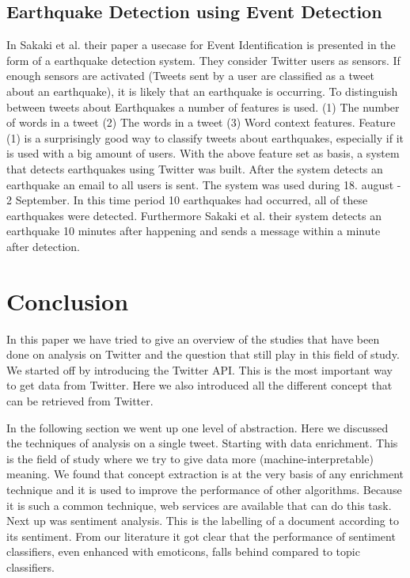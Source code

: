 \documentclass{article}
\begin{document}
\subsection*{Earthquake Detection using Event Detection}

In Sakaki et al. their paper a usecase for Event Identification is presented in the form of a earthquake detection system. \cite{earthq} They consider 
Twitter users as sensors. If enough sensors are activated (Tweets sent by a user are classified as a tweet about an earthquake), it is likely that an 
earthquake is occurring. 
To distinguish between tweets about Earthquakes a number of features is used. (1) The number of words in a tweet (2) The words in a tweet (3) Word context 
features. Feature (1) is a surprisingly good way to classify tweets about earthquakes, especially if it is used with a big amount of users. With the above 
feature set as basis, a system that detects earthquakes using Twitter was built. After the system detects an earthquake an email to all users is sent. 
The system was used during 18. august - 2 September. In this time period 10 earthquakes had occurred, all of these earthquakes were detected. Furthermore 
Sakaki et al. their system detects an earthquake 10 minutes after happening and sends a message within a minute after detection. 
\cite{earthq}



\section{Conclusion}

In this paper we have tried to give an overview of the studies that have been done on analysis on Twitter and the question that still play in this field of study. We started off by introducing the Twitter API. This is the most important way to get data from Twitter. Here we also introduced all the different concept that can be retrieved from Twitter. 

In the following section we went up one level of abstraction. Here we discussed the techniques of analysis on a single tweet. Starting with data enrichment. This is the field of study where we try to give data more (machine-interpretable) meaning. We found that concept extraction is at the very basis of any enrichment technique and it is used to improve the performance of other algorithms. Because it is such a common technique, web services are available that can do this task. Next up was sentiment analysis. This is the labelling of a document according to its sentiment. From our literature it got clear that the performance of sentiment classifiers, even enhanced with emoticons, falls behind compared to topic classifiers. 
\end{document}
